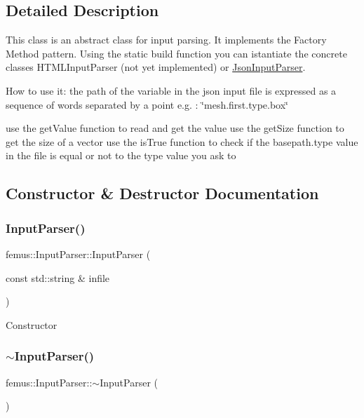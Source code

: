 \subsection{Detailed Description}
This class is an abstract class for input parsing. It implements the Factory Method pattern. Using the static {\ttfamily build} function you can istantiate the concrete classes H\+T\+M\+L\+Input\+Parser (not yet implemented) or \mbox{\hyperlink{classfemus_1_1_json_input_parser}{Json\+Input\+Parser}}.

How to use it\+: the path of the variable in the json input file is expressed as a sequence of words separated by a point e.\+g. \+: \char`\"{}mesh.\+first.\+type.\+box\char`\"{}

use the get\+Value function to read and get the value use the get\+Size function to get the size of a vector use the is\+True function to check if the basepath.\+type value in the file is equal or not to the type value you ask to 

\subsection{Constructor \& Destructor Documentation}
\mbox{\label{classfemus_1_1_input_parser_af725bf48606f5d6da52ad5c5e72b9c8f}} 
\subsubsection{\texorpdfstring{Input\+Parser()}{InputParser()}}
{\footnotesize\ttfamily femus\+::\+Input\+Parser\+::\+Input\+Parser (\begin{DoxyParamCaption}\item[{const std\+::string \&}]{infile }\end{DoxyParamCaption})}

Constructor \mbox{\label{classfemus_1_1_input_parser_ac42285bec1539805047252ad5245d8c6}} 
\subsubsection{\texorpdfstring{$\sim$\+Input\+Parser()}{~InputParser()}}
{\footnotesize\ttfamily femus\+::\+Input\+Parser\+::$\sim$\+Input\+Parser (\begin{DoxyParamCaption}{ }\end{DoxyParamCaption})\hspace{0.3cm}{\ttfamily [virtual]}}

